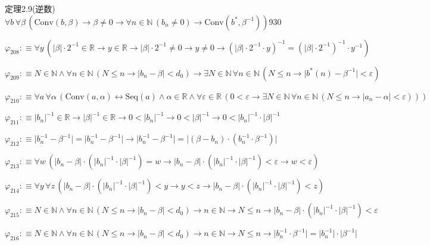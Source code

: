 \begin{fullproof}{定理2.9(逆数)}{$\forall b\,\forall \beta\,(\mathrm{Conv}(b,\beta) \to \beta \neq 0 \to \forall n \in \mathbb{N}\,(b_{n} \neq 0) \to \mathrm{Conv}(b^{\ast},\beta^{-1}))$}{930}
\begin{abbrevlist}
\item $\varphi_{208} :\equiv \forall y\,(\lvert \beta \rvert \cdot 2^{-1} \in \mathbb{R} \to y \in \mathbb{R} \to \lvert \beta \rvert \cdot 2^{-1} \neq 0 \to y \neq 0 \to (\lvert \beta \rvert \cdot 2^{-1} \cdot y)^{-1} = (\lvert \beta \rvert \cdot 2^{-1})^{-1} \cdot y^{-1})$
\item $\varphi_{209} :\equiv N \in \mathbb{N} \land \forall n \in \mathbb{N}\,(N \leq n \to \lvert b_{n} - \beta \rvert < d_{0}) \to \exists N \in \mathbb{N}\,\forall n \in \mathbb{N}\,(N \leq n \to \lvert b^{\ast}(n) - \beta^{-1} \rvert < \varepsilon)$
\item $\varphi_{210} :\equiv \forall a\,\forall \alpha\,(\mathrm{Conv}(a,\alpha) \leftrightarrow \mathrm{Seq}(a) \land \alpha \in \mathbb{R} \land \forall \varepsilon \in \mathbb{R}\,(0 < \varepsilon \to \exists N \in \mathbb{N}\,\forall n \in \mathbb{N}\,(N \leq n \to \lvert a_{n} - \alpha \rvert < \varepsilon)))$
\item $\varphi_{211} :\equiv \lvert b_{n} \rvert^{-1} \in \mathbb{R} \to \lvert \beta \rvert^{-1} \in \mathbb{R} \to 0 < \lvert b_{n} \rvert^{-1} \to 0 < \lvert \beta \rvert^{-1} \to 0 < \lvert b_{n} \rvert^{-1} \cdot \lvert \beta \rvert^{-1}$
\item $\varphi_{212} :\equiv \lvert b_{n}^{-1} - \beta^{-1} \rvert = \lvert b_{n}^{-1} - \beta^{-1} \rvert \to \lvert b_{n}^{-1} - \beta^{-1} \rvert = \lvert (\beta - b_{n}) \cdot (b_{n}^{-1} \cdot \beta^{-1}) \rvert$
\item $\varphi_{213} :\equiv \forall w\,(\lvert b_{n} - \beta \rvert \cdot (\lvert b_{n} \rvert^{-1} \cdot \lvert \beta \rvert^{-1}) = w \to \lvert b_{n} - \beta \rvert \cdot (\lvert b_{n} \rvert^{-1} \cdot \lvert \beta \rvert^{-1}) < \varepsilon \to w < \varepsilon)$
\item $\varphi_{214} :\equiv \forall y\,\forall z\,(\lvert b_{n} - \beta \rvert \cdot (\lvert b_{n} \rvert^{-1} \cdot \lvert \beta \rvert^{-1}) < y \to y < z \to \lvert b_{n} - \beta \rvert \cdot (\lvert b_{n} \rvert^{-1} \cdot \lvert \beta \rvert^{-1}) < z)$
\item $\varphi_{215} :\equiv N \in \mathbb{N} \land \forall n \in \mathbb{N}\,(N \leq n \to \lvert b_{n} - \beta \rvert < d_{0}) \to n \in \mathbb{N} \to N \leq n \to \lvert b_{n} - \beta \rvert \cdot (\lvert b_{n} \rvert^{-1} \cdot \lvert \beta \rvert^{-1}) < \varepsilon$
\item $\varphi_{216} :\equiv N \in \mathbb{N} \land \forall n \in \mathbb{N}\,(N \leq n \to \lvert b_{n} - \beta \rvert < d_{0}) \to n \in \mathbb{N} \to N \leq n \to \lvert b_{n}^{-1} \cdot \beta^{-1} \rvert = \lvert b_{n}^{-1} \rvert \cdot \lvert \beta^{-1} \rvert$

\end{abbrevlist}
\end{fullproof}
